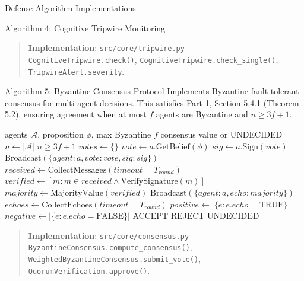\documentclass[
  ignorenonframetext,
]{beamer}
\begin{document}
\begin{frame}[fragile]{Defense Algorithm Implementations}
\begin{block}{Algorithm 4: Cognitive Tripwire Monitoring}
\begin{quote}
\textbf{Implementation}: \texttt{src/core/tripwire.py} ---
\texttt{CognitiveTripwire.check()},
\texttt{CognitiveTripwire.check\_single()},
\texttt{TripwireAlert.severity}.
\end{quote}
\end{block}

\begin{block}{Algorithm 5: Byzantine Consensus Protocol}
\protect{}\label{sec:alg-byzantine}
Implements Byzantine fault-tolerant consensus for multi-agent decisions.
This satisfies Part 1, Section 5.4.1 (Theorem 5.2), ensuring agreement
when at most \(f\) agents are Byzantine and \(n \geq 3f + 1\).

\begin{algorithm}
\caption{Byzantine Consensus Protocol}
\label{alg:byzantine-impl}
\begin{algorithmic}[1]
\Require agents $\mathcal{A}$, proposition $\phi$, max Byzantine $f$
\Ensure consensus value or UNDECIDED
  \State $n \gets |\mathcal{A}|$
  \Require $n \geq 3f + 1$
  \State $votes \gets \{\}$
  \State {}
    \State $vote \gets a.\text{GetBelief}(\phi)$
    \State $sig \gets a.\text{Sign}(vote)$
    \State $\text{Broadcast}(\{agent: a, vote: vote, sig: sig\})$
  \EndFor
  \State {}
    \State $received \gets \text{CollectMessages}(timeout = T_{round})$
    \State $verified \gets [m : m \in received \land \text{VerifySignature}(m)]$
      \State $majority \gets \text{MajorityValue}(verified)$
      \State $\text{Broadcast}(\{agent: a, echo: majority\})$
    \EndIf
  \EndFor
  \State {}
  \State $echoes \gets \text{CollectEchoes}(timeout = T_{round})$
  \State $positive \gets |\{e : e.echo = \text{TRUE}\}|$
  \State $negative \gets |\{e : e.echo = \text{FALSE}\}|$
    \Return ACCEPT
    \Return REJECT
  \Else
    \Return UNDECIDED
  \EndIf
\EndFunction
\end{algorithmic}
\end{algorithm}

\begin{quote}
\textbf{Implementation}: \texttt{src/core/consensus.py} ---
\texttt{ByzantineConsensus.compute\_consensus()},
\texttt{WeightedByzantineConsensus.submit\_vote()},
\texttt{QuorumVerification.approve()}.
\end{quote}
\end{block}


\end{frame}
\end{document}
